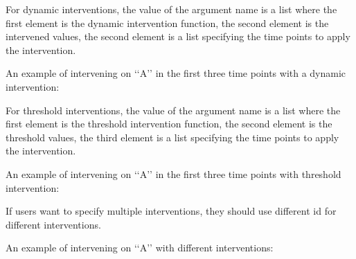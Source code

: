 \documentclass[letterpaper,10pt,english]{sphinxmanual}
\begin{document}
\sphinxAtStartPar
For dynamic interventions, the value of the argument name is a list where the first element is the dynamic intervention function, the second element
is the intervened values, the second element is a list specifying the time points to apply the intervention.

\sphinxAtStartPar
An example of intervening on ‘‘A’’ in the first three time points with a dynamic intervention:

\begin{sphinxVerbatim}[commandchars=\\\{\}]
  \PYG{p}{[} \PYG{p}{[}  \PYG{p}{]}\PYG{p}{]}
\end{sphinxVerbatim}

\sphinxAtStartPar
For threshold interventions, the value of the argument name is a list where the first element is the threshold intervention function, the second element
is the threshold values, the third element is a list specifying the time points to apply the intervention.

\sphinxAtStartPar
An example of intervening on ‘‘A’’ in the first three time points with threshold intervention:

\begin{sphinxVerbatim}[commandchars=\\\{\}]
  \PYG{p}{[} \PYG{p}{[} \PYG{p}{]} \PYG{p}{[}  \PYG{p}{]}\PYG{p}{]}
\end{sphinxVerbatim}

\sphinxAtStartPar
If users want to specify multiple interventions, they should use different id for different interventions.

\sphinxAtStartPar
An example of intervening on ‘‘A’’ with different interventions:

\begin{sphinxVerbatim}[commandchars=\\\{\}]
  \PYG{p}{[} \PYG{p}{]}
  \PYG{p}{[}\PYG{p}{]}
  \PYG{p}{[} \PYG{p}{[} \PYG{p}{]}\PYG{p}{]}
\end{sphinxVerbatim}
\end{document}
